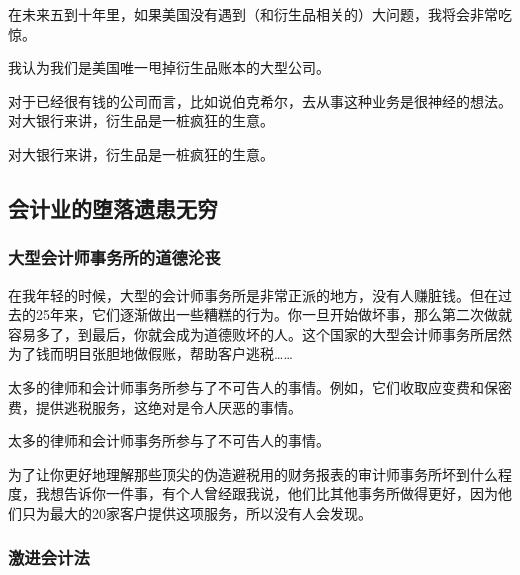在未来五到十年里，如果美国没有遇到（和衍生品相关的）大问题，我将会非常吃惊。
\par

我认为我们是美国唯一甩掉衍生品账本的大型公司。
\par

对于已经很有钱的公司而言，比如说伯克希尔，去从事这种业务是很神经的想法。对大银行来讲，衍生品是一桩疯狂的生意。
\par

\begin{WisdomBox}
\par

对大银行来讲，衍生品是一桩疯狂的生意。
\par
\end{WisdomBox}

\subsection*{会计业的堕落遗患无穷}

\subsubsection*{大型会计师事务所的道德沦丧}

在我年轻的时候，大型的会计师事务所是非常正派的地方，没有人赚脏钱。但在过去的25年来，它们逐渐做出一些糟糕的行为。你一旦开始做坏事，那么第二次做就容易多了，到最后，你就会成为道德败坏的人。这个国家的大型会计师事务所居然为了钱而明目张胆地做假账，帮助客户逃税……
\par

太多的律师和会计师事务所参与了不可告人的事情。例如，它们收取应变费和保密费，提供逃税服务，这绝对是令人厌恶的事情。
\par

\begin{WisdomBox}
\par

太多的律师和会计师事务所参与了不可告人的事情。
\par
\end{WisdomBox}

为了让你更好地理解那些顶尖的伪造避税用的财务报表的审计师事务所坏到什么程度，我想告诉你一件事，有个人曾经跟我说，他们比其他事务所做得更好，因为他们只为最大的20家客户提供这项服务，所以没有人会发现。
\par

\subsubsection*{激进会计法}

